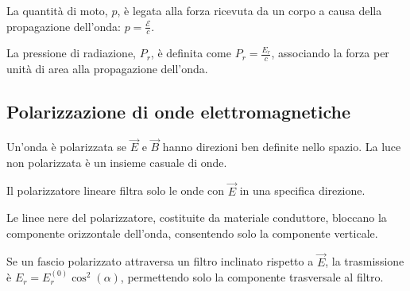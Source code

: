 La quantità di moto, $p$, è legata alla forza ricevuta da un corpo a causa della propagazione dell'onda: $p = \frac{\mathcal{E}}{c}$.

La pressione di radiazione, $P_r$, è definita come $P_r = \frac{E_r}{c}$, associando la forza per unità di area alla propagazione dell'onda.

\subsection{Polarizzazione di onde elettromagnetiche}

Un'onda è polarizzata se $\vec{E}$ e $\vec{B}$ hanno direzioni ben definite nello spazio. La luce non polarizzata è un insieme casuale di onde.


Il polarizzatore lineare filtra solo le onde con $\vec{E}$ in una specifica direzione.


Le linee nere del polarizzatore, costituite da materiale conduttore, bloccano la componente orizzontale dell'onda, consentendo solo la componente verticale.

Se un fascio polarizzato attraversa un filtro inclinato rispetto a $\vec{E}$, la trasmissione è $E_r = E_r^{(0)} \cos^2(\alpha)$, permettendo solo la componente trasversale al filtro.